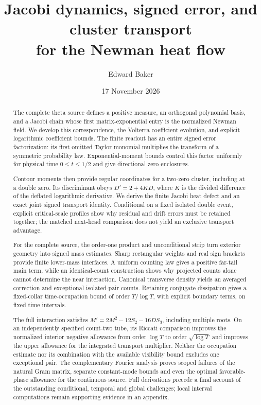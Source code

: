 \documentclass[11pt]{article}
\title{Jacobi dynamics, signed error, and cluster transport\\
       for the Newman heat flow}
\author{Edward Baker}
\date{17 November 2026}
\numberwithin{equation}{section}
\begin{document}
\maketitle

\begin{abstract}
The complete theta source defines a positive measure, an orthogonal
polynomial basis, and a Jacobi chain whose first matrix-exponential
entry is the normalized Newman field. We develop this correspondence,
the Volterra coefficient evolution, and explicit logarithmic coefficient
bounds. The finite readout has an entire signed error factorization:
its first omitted Taylor monomial multiplies the transform of a symmetric
probability law. Exponential-moment bounds control this factor uniformly
for physical time \(0\le t\le1/2\) and give directional zero enclosures.

Contour moments then provide regular coordinates for a two-zero cluster,
including at a double zero. Its discriminant obeys
\(D'=2+4KD\), where \(K\) is the divided difference of the deflated
logarithmic derivative. We derive the finite Jacobi heat defect and
an exact joint signed transport identity. Conditional on a fixed isolated
double event, explicit critical-scale profiles show why residual and
drift errors must be retained together; the matched next-head comparison
does not yield an exclusive transport advantage.

For the complete source, the order-one product and unconditional strip
turn exterior geometry into signed mass estimates. Sharp rectangular
weights and real sign brackets provide finite lower-mass interfaces.
A uniform counting law gives a positive far-tail main term, while an
identical-count construction shows why projected counts alone cannot
determine the near interaction. Canonical transverse density yields an
averaged correction and exceptional isolated-pair counts. Retaining
conjugate dissipation gives a fixed-collar time-occupation bound of
order \(T/\log T\), with explicit boundary terms, on fixed time intervals.

The full interaction satisfies
\(M'=2M^2-12S_2-16DS_3\), including multiple roots. On an independently
specified count-two tube, its Riccati comparison improves the normalized
interior negative allowance from order \(\log T\) to order
\(\sqrt{\log T}\) and improves the upper allowance for the integrated transport multiplier.
Neither the occupation estimate nor its combination with the available
visibility bound excludes one exceptional pair. The complementary
Fourier analysis proves scoped failures of the natural Gram matrix,
separate constant-mode bounds and even the optimal favorable-phase
allowance for the continuous source. Full derivations precede a final
account of the outstanding conditional, temporal and global challenges;
local interval computations remain supporting evidence in an appendix.
\end{abstract}
\end{document}
